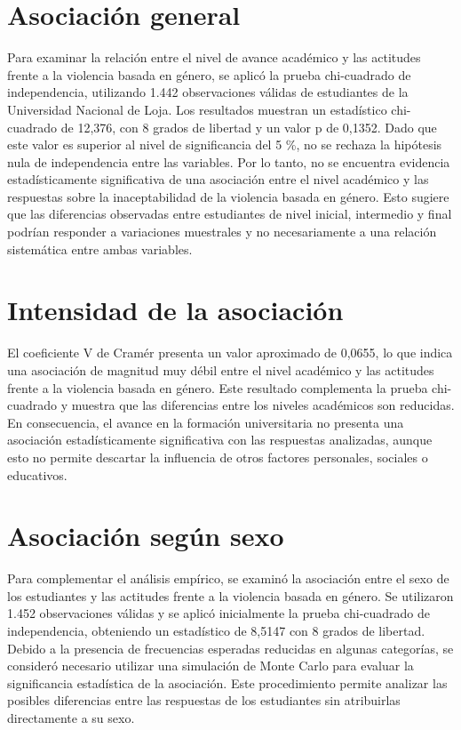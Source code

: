 \documentclass[
  spanish,
  11pt,
  letterpaper,
  DIV=11,
  numbers=noendperiod]{scrreprt}
\begin{document}
\section{Asociación general}\label{asociaciuxf3n-general}

Para examinar la relación entre el nivel de avance académico y las
actitudes frente a la violencia basada en género, se aplicó la prueba
chi-cuadrado de independencia, utilizando 1.442 observaciones válidas de
estudiantes de la Universidad Nacional de Loja. Los resultados muestran
un estadístico chi-cuadrado de 12,376, con 8 grados de libertad y un
valor p de 0,1352. Dado que este valor es superior al nivel de
significancia del 5 \%, no se rechaza la hipótesis nula de independencia
entre las variables. Por lo tanto, no se encuentra evidencia
estadísticamente significativa de una asociación entre el nivel
académico y las respuestas sobre la inaceptabilidad de la violencia
basada en género. Esto sugiere que las diferencias observadas entre
estudiantes de nivel inicial, intermedio y final podrían responder a
variaciones muestrales y no necesariamente a una relación sistemática
entre ambas variables.

\section{Intensidad de la
asociación}\label{intensidad-de-la-asociaciuxf3n}

El coeficiente V de Cramér presenta un valor aproximado de 0,0655, lo
que indica una asociación de magnitud muy débil entre el nivel académico
y las actitudes frente a la violencia basada en género. Este resultado
complementa la prueba chi-cuadrado y muestra que las diferencias entre
los niveles académicos son reducidas. En consecuencia, el avance en la
formación universitaria no presenta una asociación estadísticamente
significativa con las respuestas analizadas, aunque esto no permite
descartar la influencia de otros factores personales, sociales o
educativos.

\section{Asociación según sexo}\label{asociaciuxf3n-seguxfan-sexo}

Para complementar el análisis empírico, se examinó la asociación entre
el sexo de los estudiantes y las actitudes frente a la violencia basada
en género. Se utilizaron 1.452 observaciones válidas y se aplicó
inicialmente la prueba chi-cuadrado de independencia, obteniendo un
estadístico de 8,5147 con 8 grados de libertad. Debido a la presencia de
frecuencias esperadas reducidas en algunas categorías, se consideró
necesario utilizar una simulación de Monte Carlo para evaluar la
significancia estadística de la asociación. Este procedimiento permite
analizar las posibles diferencias entre las respuestas de los
estudiantes sin atribuirlas directamente a su sexo.
\end{document}
